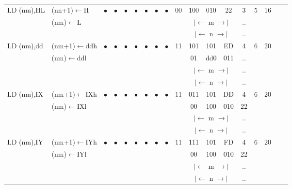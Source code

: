 \documentclass[oneside,a4paper]{book}
\newcommand{\instrt}{\rule{0pt}{2.7ex}}
\newcommand{\instrb}{\rule[-1.7ex]{0pt}{0pt}}
\begin{document}
{\begin{tabular}{llcccccccccccccccl}
		LD (nm),HL\instrt &
			(nn+1)$\leftarrow$H &
			$\bullet$ & 
				$\bullet$ & 
				$\bullet$ & 
				$\bullet$ & 
				$\bullet$ & 
				$\bullet$ & 
				$\bullet$ & 
			00 & 100 & 010 & 
			22 & 3 & 
			5 & 16 & \\ 
		& (nm)$\leftarrow$L & \multicolumn{8}{c}{} & \multicolumn{3}{c}{$|\longleftarrow$ m $\longrightarrow|$} & .. & & & \\
		\multicolumn{10}{c}{} & \multicolumn{3}{c}{$|\longleftarrow$ n $\longrightarrow|$} & .. & & & \instrb \\

		LD (nm),dd\instrt & 
			(nm+1)$\leftarrow$ddh &
			$\bullet$ & 
				$\bullet$ & 
				$\bullet$ & 
				$\bullet$ & 
				$\bullet$ & 
				$\bullet$ & 
				$\bullet$ & 
			11 & 101 & 101 & 
			ED & 4 & 
			6 & 20 & \\ 
		& (nm)$\leftarrow$ddl & \multicolumn{8}{c}{} & 01 & dd0 & 011 & .. & & & \\
		\multicolumn{10}{c}{} & \multicolumn{3}{c}{$|\longleftarrow$ m $\longrightarrow|$} & .. & & & \\
		\multicolumn{10}{c}{} & \multicolumn{3}{c}{$|\longleftarrow$ n $\longrightarrow|$} & .. & & & \instrb \\

		LD (nm),IX\instrt & 
			(nm+1)$\leftarrow$IXh &
			$\bullet$ & 
				$\bullet$ & 
				$\bullet$ & 
				$\bullet$ & 
				$\bullet$ & 
				$\bullet$ & 
				$\bullet$ & 
			11 & 011 & 101 & 
			DD & 4 & 
			6 & 20 & \\ 
		& (nm)$\leftarrow$IXl & \multicolumn{8}{c}{} & 00 & 100 & 010 & 22 & & & \\
		\multicolumn{10}{c}{} & \multicolumn{3}{c}{$|\longleftarrow$ m $\longrightarrow|$} & .. & & & \\
		\multicolumn{10}{c}{} & \multicolumn{3}{c}{$|\longleftarrow$ n $\longrightarrow|$} & .. & & & \instrb \\

		LD (nm),IY\instrt & 
			(nm+1)$\leftarrow$IYh &
			$\bullet$ & 
				$\bullet$ & 
				$\bullet$ & 
				$\bullet$ & 
				$\bullet$ & 
				$\bullet$ & 
				$\bullet$ & 
			11 & 111 & 101 & 
			FD & 4 & 
			6 & 20 & \\ 
		& (nm)$\leftarrow$IYl & \multicolumn{8}{c}{} & 00 & 100 & 010 & 22 & & & \\
		\multicolumn{10}{c}{} & \multicolumn{3}{c}{$|\longleftarrow$ m $\longrightarrow|$} & .. & & & \\
		\multicolumn{10}{c}{} & \multicolumn{3}{c}{$|\longleftarrow$ n $\longrightarrow|$} & .. & & & \instrb \\


\end{tabular}}
\end{document}
